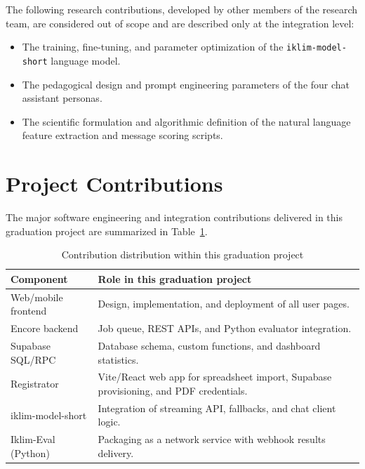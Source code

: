 \documentclass[12pt,a4paper,oneside]{report}
\begin{document}
    The following research contributions, developed by other members of the research team, are considered out of scope and are described only at the integration level:
    \begin{itemize}
        \item The training, fine-tuning, and parameter optimization of the \texttt{iklim-model-short} language model.
        \item The pedagogical design and prompt engineering parameters of the four chat assistant personas.
        \item The scientific formulation and algorithmic definition of the natural language feature extraction and message scoring scripts.
    \end{itemize}

    \section{Project Contributions}
    The major software engineering and integration contributions delivered in this graduation project are summarized in Table~\ref{tab:contributions}.

    \begin{table}[H]
        \centering
        \caption{Contribution distribution within this graduation project}
        \label{tab:contributions}
        \begin{tabular}{@{}p{5.5cm}p{7.5cm}@{}}
            \toprule
            \textbf{Component} & \textbf{Role in this graduation project} \\
            \midrule
            Web/mobile frontend & Design, implementation, and deployment of all user pages. \\
            Encore backend & Job queue, REST APIs, and Python evaluator integration. \\
            Supabase SQL/RPC & Database schema, custom functions, and dashboard statistics. \\
            Registrator & Vite/React web app for spreadsheet import, Supabase provisioning, and PDF credentials. \\
            iklim-model-short & Integration of streaming API, fallbacks, and chat client logic. \\
            Iklim-Eval (Python) & Packaging as a network service with webhook results delivery. \\
            \bottomrule
        \end{tabular}
    \end{table}
\end{document}
